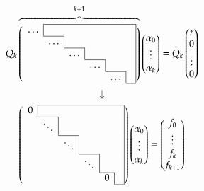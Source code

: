 \documentclass{article}
\begin{document}
\[
  Q_k \overbrace{\left(
    \begin{array}{cccccc} \cline{2-6}
        \ldots & \multicolumn{1}{|c}{} & & & & \multicolumn{1}{c|}{} \\ \cline{2-2}
        & \multicolumn{1}{c|}{\ldots} & & & & \multicolumn{1}{c|}{} \\ \cline{3-3}
        & & \multicolumn{1}{c|}{\ldots} & & & \multicolumn{1}{c|}{} \\ \cline{4-4}
        & & & \multicolumn{1}{c|}{\ldots} & & \multicolumn{1}{c|}{} \\ \cline{5-5}
        & & & & \multicolumn{1}{c|}{\ldots} & \multicolumn{1}{c|}{} \\ \cline{6-6}
    \end{array}
  \right)}^{k+1}
  \begin{pmatrix}
    \alpha_0 \\ \vdots \\ \alpha_k
  \end{pmatrix}
  =
  Q_k
  \begin{pmatrix}
    r \\ 0 \\ \vdots \\ 0
  \end{pmatrix}
\] \[ \downarrow \] \[
  \left(
    \begin{array}{cccccc} \cline{2-6}
        0 & \multicolumn{1}{|c}{} & & & & \multicolumn{1}{c|}{} \\ \cline{2-2}
        & \multicolumn{1}{c|}{\ddots} & & & & \multicolumn{1}{c|}{} \\ \cline{3-3}
        & & \multicolumn{1}{c|}{\ddots} & & & \multicolumn{1}{c|}{} \\ \cline{4-4}
        & & & \multicolumn{1}{c|}{\ddots} & & \multicolumn{1}{c|}{} \\ \cline{5-5}
        & & & & \multicolumn{1}{c|}{0} & \multicolumn{1}{c|}{} \\ \cline{6-6}
    \end{array}
  \right)
  \begin{pmatrix} \alpha_0 \\ \vdots \\ \alpha_k \end{pmatrix}
  =
  \begin{pmatrix} f_0 \\ \vdots \\ f_k \\ f_{k+1} \end{pmatrix}
\]
\end{document}
